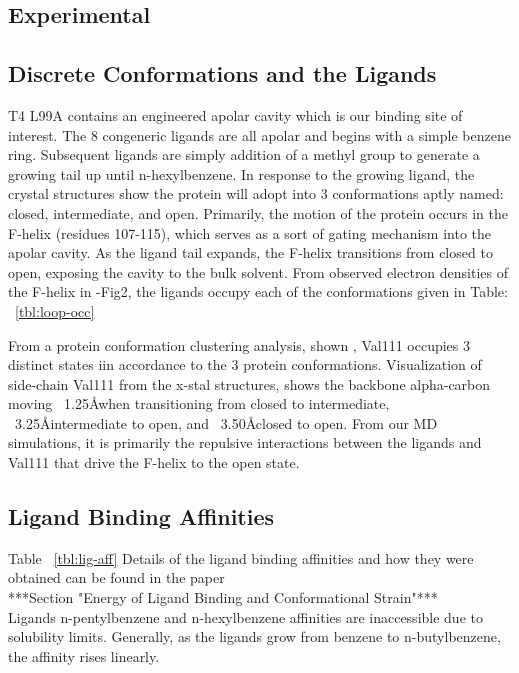 \documentclass[journal=jctcce,manuscript=article]{achemso}
\begin{document}
\begin{suppinfo}
\section{Experimental}
\subsection{Discrete Conformations and the Ligands}
T4 L99A contains an engineered apolar cavity which is our binding site of interest.
The 8 congeneric ligands are all apolar and begins with a simple benzene ring.
Subsequent ligands are simply addition of a methyl group to generate a growing tail up until n-hexylbenzene.
In response to the growing ligand, the crystal structures show the protein will adopt into 3 conformations aptly named: closed, intermediate, and open.
Primarily, the motion of the protein occurs in the F-helix (residues 107-115), which serves as a sort of gating mechanism into the apolar cavity.
As the ligand tail expands, the F-helix transitions from closed to open, exposing the cavity to the bulk solvent.
From observed electron densities of the F-helix in \cite{Merski2015}-Fig2, the ligands occupy each of the conformations given in Table: ~\ref{tbl:loop-occ}

From a protein conformation clustering analysis, shown \cite{Merski2015}, Val111 occupies 3 distinct states iin accordance to the 3 protein conformations.
Visualization of side-chain Val111 from the x-stal structures, shows the backbone alpha-carbon moving ~1.25\AA when transitioning from closed to intermediate, ~3.25\AA intermediate to open, and ~3.50\AA closed to open.
From our MD simulations, it is primarily the repulsive interactions between the ligands and Val111 that drive the F-helix to the open state.

\subsection{Ligand Binding Affinities}
Table ~\ref{tbl:lig-aff}
Details of the ligand binding affinities and how they were obtained can be found in the paper \cite{Merski2015} \\
***Section "Energy of Ligand Binding and Conformational Strain"***\\
Ligands n-pentylbenzene and n-hexylbenzene affinities are inaccessible due to solubility limits.
Generally, as the ligands grow from benzene to n-butylbenzene, the affinity rises linearly.


\end{suppinfo}
\end{document}
